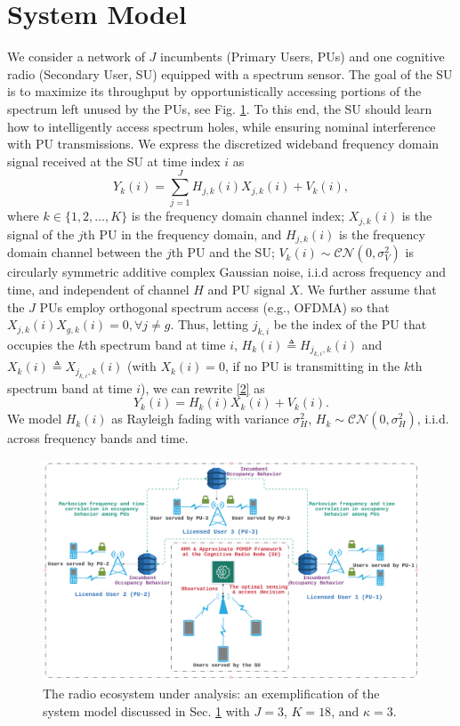 \documentclass[10pt,twocolumn]{IEEEtran}
\begin{document}
\section{System Model}\label{II}
We consider a network of $J$ incumbents (Primary Users, PUs) and one cognitive radio (Secondary User, SU) equipped with a spectrum sensor. The goal of the SU is to maximize its throughput by opportunistically accessing portions of the spectrum left unused by the PUs, see Fig. \ref{fig:0}. To this end, the SU should learn how to intelligently access spectrum holes, while ensuring nominal interference with PU transmissions.
We express the discretized wideband frequency domain signal received at the SU
at time index $i$ as
\begin{equation}\label{2}
    Y_k(i) = \sum_{j=1}^{J} H_{j,k}(i)X_{j,k}(i) + V_k(i),
\end{equation}
where  $k {\in} \{1,2,\dots,K\}$
is the frequency domain channel index; $X_{j,k}(i)$ is the signal of the $j$th PU in the frequency domain, and $H_{j,k}(i)$ is the frequency domain channel between the $j$th PU and the SU; $V_k(i) {\sim} \mathcal{CN}(0,\sigma_V^2)$ is circularly symmetric additive complex Gaussian noise, i.i.d across frequency and time, and independent of channel $H$ and PU signal $X$. We further assume that the $J$ PUs employ orthogonal spectrum access (e.g., OFDMA) so that $X_{j,k}(i)X_{g,k}(i){=}0, \forall j{\neq}g$. Thus, letting $j_{k,i}$ be the index of the PU that occupies the $k$th spectrum band at time $i$, $H_{k}(i){\triangleq}H_{j_{k,i},k}(i)$ and $X_{k}(i){\triangleq}X_{j_{k,i},k}(i)$ (with $X_{k}(i){=}0$, if no PU is transmitting in the $k$th spectrum band at time $i$), we can rewrite \eqref{2} as 
\begin{equation}\label{3}
    Y_k(i) = H_{k}(i)X_{k}(i) + V_k(i).
\end{equation}
We model $H_{k}(i)$ as Rayleigh fading with variance $\sigma_H^2$, $H_k {\sim} \mathcal{CN}(0,\sigma_H^2)$, i.i.d. across frequency bands and time.
\begin{figure} [t]
    \centering
    \includegraphics[width=1.0\linewidth]{System_Model_1.png}
    \caption{The radio ecosystem under analysis: an exemplification of the system model discussed in Sec. \ref{II} with $J{=}3$, $K{=}18$, and $\kappa{=}3$.}
    \label{fig:0}
    \vspace{-6mm}
\end{figure}
\end{document}
